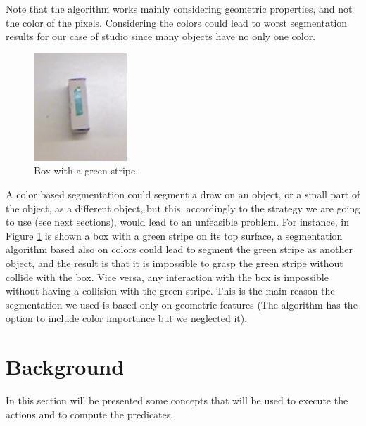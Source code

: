 Note that the algorithm works mainly considering geometric properties, and not the color of the pixels. Considering the colors could lead to worst segmentation results for our case of studio since many objects have no only one color.

\begin{figure}
\centering
\caption{Box with a green stripe.}\label{fig:seg_color}
\includegraphics[width=3.5cm]{Img/ObjectSegmentation/color_seg_problem.png}
\end{figure}
A color based segmentation could segment a draw on an object, or a small part of the object, as a different object, but this, accordingly to the strategy we are going to use (see next sections), would lead to an unfeasible problem. 
For instance, in Figure \ref{fig:seg_color} is shown a box with a green stripe on its top surface, a segmentation algorithm based also on colors could lead to segment the green stripe as another object, and the result is that it is impossible to grasp the green stripe without collide with the box. Vice versa, any interaction with the box is impossible without having a collision with the green stripe. This is the main reason the segmentation we used is based only on geometric features (The  algorithm has the option to include color importance but we neglected it). 


\section{Background}
\label{sec:background_alg}

In this section will be presented some concepts that will be used to execute the actions and to compute the predicates. 

